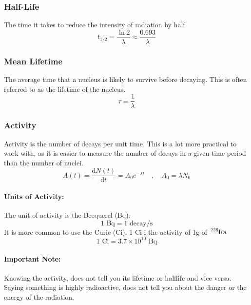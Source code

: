 \subsubsection{Half-Life}
The time it takes to reduce the intensity of radiation by half. 
\begin{equation}
  t_{1/2} = \frac{\ln 2}{λ} ≈ \frac{0.693}{λ}
\end{equation}

\subsubsection{Mean Lifetime}
The average time that a  nucleus is likely to survive before decaying. This is often referred to as the lifetime of the nucleus.
\begin{equation}
  τ = \frac{1}{λ}
\end{equation}

\subsubsection{Activity}
Activity is the number of decays per unit time. This is a lot more practical to work with, as it is easier to measure the number of decays in a given time period than the number of nuclei.
\begin{equation}
  A(t) = \frac{\mathrm{d}N(t)}{\mathrm{d}t} =  A_0 e^{-λt} \quad , \quad  A_0 = λN_0
\end{equation}

\paragraph{Units of Activity:} 
The unit of activity is the Becquerel (Bq). 
\begin{equation}
  1 \text{ Bq} = 1 \text{ decay/s}
\end{equation}
It is more common to use the Curie (Ci). 1 Ci i the activity of 1g of $\ce{_{}^{226}\text{Ra}_{}}$
\begin{equation}
  1 \text{ Ci} = 3.7 \times 10^{10} \text{ Bq}
\end{equation}

\paragraph{Important Note:}
Knowing the activity, does not tell you its lifetime or halflife and vice versa. Saying something is highly radioactive, does not tell you about the danger or the energy of the radiation.

